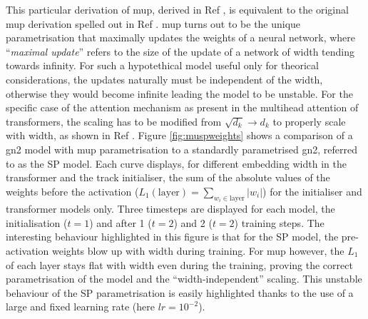 This particular derivation of \gls{mup}, derived in Ref \cite{yang2021tuning}, is equivalent to the original \gls{mup} derivation spelled out in Ref \cite{pmlr-v139-yang21c}. \gls{mup} turns out to be the unique parametrisation that maximally updates the weights of a neural network, where ``\textit{maximal update}'' refers to the size of the update of a network of width tending towards infinity. For such a hypotethical model useful only for theorical considerations, the updates naturally must be independent of the width, otherwise they would become infinite leading the model to be unstable. For the specific case of the attention mechanism as present in the multihead attention of transformers, the scaling has to be modified from $\sqrt{d_k} \rightarrow d_k$ to properly scale with width, as shown in Ref \cite{yang2021tuning}. Figure \ref{fig:muspweights} shows a comparison of a \gls{gn2} model with \gls{mup} parametrisation to a standardly parametrised \gls{gn2}, referred to as the SP model. Each curve displays, for different embedding width in the transformer and the track initialiser, the sum of the absolute values of the weights before the activation ($L_1(\textrm{layer}) = \sum_{w_i \in \textrm{layer}} |w_i|$) for the initialiser and transformer models only. Three timesteps are displayed for each model, the initialisation ($t=1$) and after 1 ($t=2$) and 2 ($t=2$) training steps. The interesting behaviour highlighted in this figure is that for the SP model, the pre-activation weights blow up with width during training. For \gls{mup} however, the $L_1$ of each layer stays flat with width even during the training, proving the correct parametrisation of the model and the ``width-independent'' scaling. This unstable behaviour of the SP parametrisation is easily highlighted thanks to the use of a large and fixed learning rate (here $lr = 10^{-2}$). 

